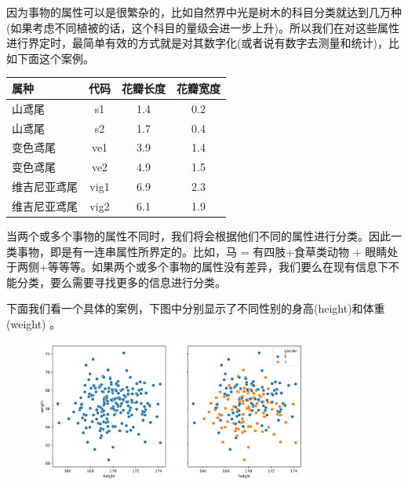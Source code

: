 \documentclass[12pt]{article}
\numberwithin{figure}{section}
\numberwithin{equation}{section}
\begin{document}
因为事物的属性可以是很繁杂的，比如自然界中光是树木的科目分类就达到几万种(如果考虑不同植被的话，这个科目的量级会进一步上升)。所以我们在对这些属性进行界定时，最简单有效的方式就是对其数字化(或者说有数字去测量和统计)，比如下面这个案例。
\begin{table}[H]
		\centering
		\begin{tabular}{lccc}
		\hline 
			属种 & 代码 &花瓣长度 & 花瓣宽度 \\
			\hline 
			山鸢尾 & s1 & 1.4 & 0.2 \\
			山鸢尾 & s2 & 1.7 & 0.4 \\
			变色鸢尾 & ve1 & 3.9  & 1.4 \\
			变色鸢尾 & ve2& 4.9 & 1.5 \\
			维吉尼亚鸢尾 & vig1 & 6.9 & 2.3  \\
			维吉尼亚鸢尾 & vig2 & 6.1 & 1.9 \\
			\hline  
		\end{tabular}
\end{table}

\begin{lemma}
	当两个或多个事物的属性不同时，我们将会根据他们不同的属性进行分类。因此一类事物，即是有一连串属性所界定的。比如，马 = 有四肢+食草类动物 + 眼睛处于两侧+等等等。如果两个或多个事物的属性没有差异，我们要么在现有信息下不能分类，要么需要寻找更多的信息进行分类。
\end{lemma}

\begin{example}
下面我们看一个具体的案例，下图中分别显示了不同性别的身高(height)和体重(weight)	。
\begin{figure}[H]
	\centering
	\includegraphics[width=0.8\textwidth]{fig/BMI}
\end{figure}
\end{example}
\end{document}
